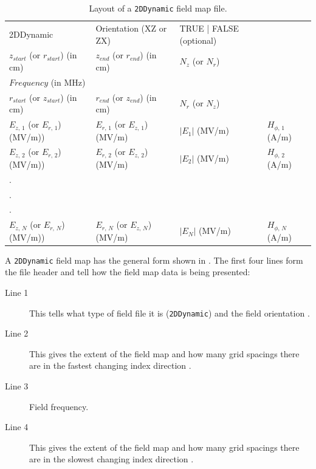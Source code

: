\begin{table}[ht!]
    \caption{Layout of a \texttt{2DDynamic} field map file.}
    \label{tab:2DDynamic}
    \begin{center}
    \begin{tabular}{llll}
      \hline
      2DDynamic & Orientation (XZ or ZX) & TRUE | FALSE (optional) & \\
      $z_{start}$ (or $r_{start}$) (in cm) & $z_{end}$ (or $r_{end}$) (in cm) & $N_{z}$ (or $N_{r}$)& \\
      $Frequency$ (in MHz) & & & \\
      $r_{start}$ (or $z_{start}$) (in cm) & $r_{end}$ (or $z_{end}$) (in cm) & $N_{r}$ (or $N_{z}$)& \\
      $E_{z,\,1}$ (or $E_{r,\,1}$) (MV/m)) & $E_{r,\,1}$ (or $E_{z,\,1}$) (MV/m) & $|E_1|$ (MV/m) & $H_{\phi,\,1}$ (A/m) \\
      $E_{z,\,2}$ (or $E_{r,\,2}$) (MV/m)) & $E_{r,\,2}$ (or $E_{z,\,2}$) (MV/m) & $|E_2|$ (MV/m) & $H_{\phi,\,2}$ (A/m) \\
      . & & \\
      . & & \\
      . & & \\
      $E_{z,\,N}$ (or $E_{r,\,N}$) (MV/m)) & $E_{r,\,N}$ (or $E_{z,\,N}$) (MV/m) & $|E_N|$ (MV/m) & $H_{\phi,\,N}$ (A/m) \\
      \hline
    \end{tabular}
    \end{center}
\end{table}

A \texttt{2DDynamic} field map has the general form shown in . The first four lines form
the file header and tell \opalt how the field map data is being presented:

\begin{description}
\item[Line 1] This tells \opalt what type of field file it is (\texttt{2DDynamic}) and the field orientation
  .
\item[Line 2] This gives the extent of the field map and how many grid spacings there are in the fastest changing
  index direction .
\item[Line 3] Field frequency.
\item[Line 4] This gives the extent of the field map and how many grid spacings there are in the slowest changing
  index direction .
\end{description}

